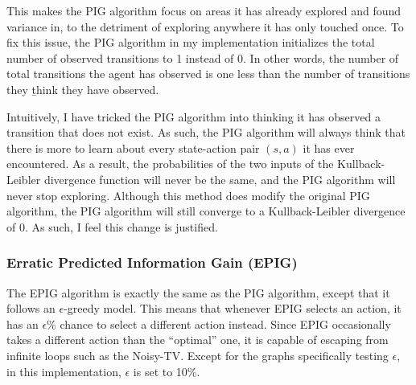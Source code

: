 \documentclass[letterpaper]{article} %
\begin{document}
This makes the PIG algorithm focus on areas it has already explored and found variance in, to the detriment of exploring anywhere it has only touched once. To fix this issue, the PIG algorithm in my implementation initializes the total number of observed transitions to 1 instead of 0. In other words, the number of total transitions the agent has observed is one less than the number of transitions they \b{think} they have observed.

Intuitively, I have tricked the PIG algorithm into thinking it has observed a transition that does not exist. As such, the PIG algorithm will always think that there is more to learn about every state-action pair $(s,a)$ it has ever encountered. As a result, the probabilities of the two inputs of the Kullback-Leibler divergence function will never be the same, and the PIG algorithm will never stop exploring. Although this method does modify the original PIG algorithm, the PIG algorithm will still converge to a Kullback-Leibler divergence of 0. As such, I feel this change is justified.

\subsubsection{Erratic Predicted Information Gain (EPIG)}
The EPIG algorithm is exactly the same as the PIG algorithm, except that it follows an $\epsilon$-greedy model. This means that whenever EPIG selects an action, it has an $\epsilon$\% chance to select a different action instead. Since EPIG occasionally takes a different action than the ``optimal'' one, it is capable of escaping from infinite loops such as the Noisy-TV. Except for the graphs specifically testing $\epsilon$, in this implementation, $\epsilon$ is set to 10\%.
\end{document}
